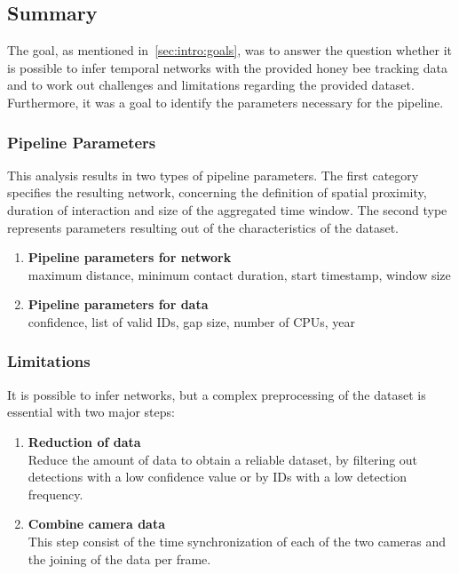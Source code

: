 \subsection{Summary}
The goal, as mentioned in~\ref{sec:intro:goals}, was to answer the question whether it is possible to infer temporal networks with the provided honey bee tracking data and to work out challenges and limitations regarding the provided dataset. Furthermore, it was a goal to identify the parameters necessary for the pipeline.

\subsubsection{Pipeline Parameters}
This analysis results in two types of pipeline parameters. The first category specifies the resulting network, concerning the definition of spatial proximity, duration of interaction and size of the aggregated time window. The second type represents parameters resulting out of the characteristics of the dataset.

\begin{enumerate}
\item \textbf{Pipeline parameters for network}\\
maximum distance, minimum contact duration, start timestamp, window size
\item \textbf{Pipeline parameters for data}\\
confidence, list of valid IDs, gap size, number of CPUs, year
\end{enumerate}


\subsubsection{Limitations}
It is possible to infer networks, but a complex preprocessing of the dataset is essential with two major steps:

\begin{enumerate}
\item \textbf{Reduction of data}\\
Reduce the amount of data to obtain a reliable dataset, by filtering out detections with a low confidence value or by IDs with a low detection frequency.
\item \textbf{Combine camera data}\\
This step consist of the time synchronization of each of the two cameras and the joining of the data per frame.
\end{enumerate}

